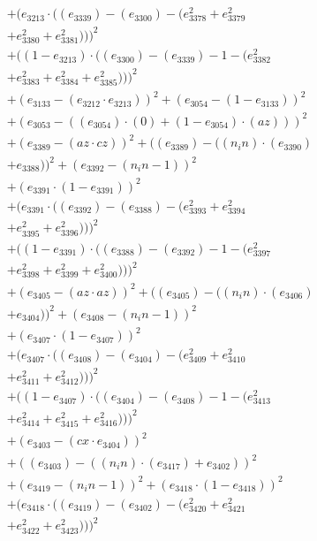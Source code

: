 \documentclass[10pt, a4paper]{article}
\begin{document}
\begin{align*}
& + (e_{3213}  \cdot  ((e_{3339}) - (e_{3300}) - (e_{3378}^{2} + e_{3379}^{2} \\
& + e_{3380}^{2} + e_{3381}^{2})))^{2} \\
& + ((1 - e_{3213})  \cdot  ((e_{3300}) - (e_{3339}) - 1 - (e_{3382}^{2} \\
& + e_{3383}^{2} + e_{3384}^{2} + e_{3385}^{2})))^{2} \\
& + (e_{3133} - (e_{3212}  \cdot  e_{3213}))^{2} + (e_{3054} - (1 - e_{3133}))^{2} \\
& + (e_{3053} - ((e_{3054})  \cdot  (0) + (1 - e_{3054})  \cdot  (az)))^{2} \\
& + (e_{3389} - (az  \cdot  cz))^{2} + ((e_{3389}) - ((n_in)  \cdot  (e_{3390}) \\
& + e_{3388}))^{2} + (e_{3392} - (n_in - 1))^{2} \\
& + (e_{3391}  \cdot  (1 - e_{3391}))^{2} \\
& + (e_{3391}  \cdot  ((e_{3392}) - (e_{3388}) - (e_{3393}^{2} + e_{3394}^{2} \\
& + e_{3395}^{2} + e_{3396}^{2})))^{2} \\
& + ((1 - e_{3391})  \cdot  ((e_{3388}) - (e_{3392}) - 1 - (e_{3397}^{2} \\
& + e_{3398}^{2} + e_{3399}^{2} + e_{3400}^{2})))^{2} \\
& + (e_{3405} - (az  \cdot  az))^{2} + ((e_{3405}) - ((n_in)  \cdot  (e_{3406}) \\
& + e_{3404}))^{2} + (e_{3408} - (n_in - 1))^{2} \\
& + (e_{3407}  \cdot  (1 - e_{3407}))^{2} \\
& + (e_{3407}  \cdot  ((e_{3408}) - (e_{3404}) - (e_{3409}^{2} + e_{3410}^{2} \\
& + e_{3411}^{2} + e_{3412}^{2})))^{2} \\
& + ((1 - e_{3407})  \cdot  ((e_{3404}) - (e_{3408}) - 1 - (e_{3413}^{2} \\
& + e_{3414}^{2} + e_{3415}^{2} + e_{3416}^{2})))^{2} \\
& + (e_{3403} - (cx  \cdot  e_{3404}))^{2} \\
& + ((e_{3403}) - ((n_in)  \cdot  (e_{3417}) + e_{3402}))^{2} \\
& + (e_{3419} - (n_in - 1))^{2} + (e_{3418}  \cdot  (1 - e_{3418}))^{2} \\
& + (e_{3418}  \cdot  ((e_{3419}) - (e_{3402}) - (e_{3420}^{2} + e_{3421}^{2} \\
& + e_{3422}^{2} + e_{3423}^{2})))^{2} \\

\end{align*}
\end{document}
